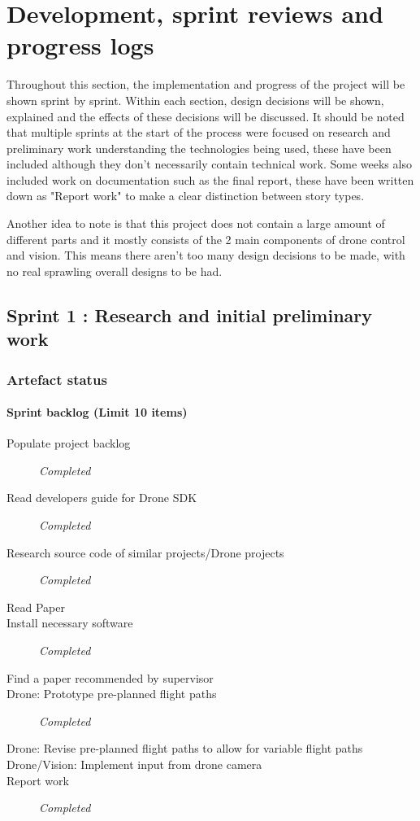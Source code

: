 \chapter{Development, sprint reviews and progress logs}

%
Throughout this section, the implementation and progress of the project will be shown sprint by sprint. Within each section, design decisions will be shown, explained and the effects of these decisions will be discussed. It should be noted that multiple sprints at the start of the process were focused on research and preliminary work understanding the technologies being used, these have been included although they don't necessarily contain technical work. Some weeks also included work on documentation such as the final report, these have been written down as "Report work" to make a clear distinction between story types.

Another idea to note is that this project does not contain a large amount of different parts and it mostly consists of the 2 main components of drone control and vision. This means there aren't too many design decisions to be made, with no real sprawling overall designs to be had.
\clearpage
\section{Sprint 1 : Research and initial preliminary work}
\subsection{Artefact status}
\subsubsection{Sprint backlog (Limit 10 items)}
\begin{description}
	\item[Populate project backlog] \em{Completed}
	\item[Read developers guide for Drone SDK] \em{Completed}
	\item[Research source code of similar projects/Drone projects] \em{Completed}
	\item[Read Paper]
	\item[Install necessary software] \em{Completed}
	\item[Find a paper recommended by supervisor]
	\item[Drone: Prototype pre-planned flight paths] \em{Completed}
	\item[Drone: Revise pre-planned flight paths to allow for variable flight paths]
	\item[Drone/Vision: Implement input from drone camera]
	\item[Report work] \em{Completed}
\end{description}

